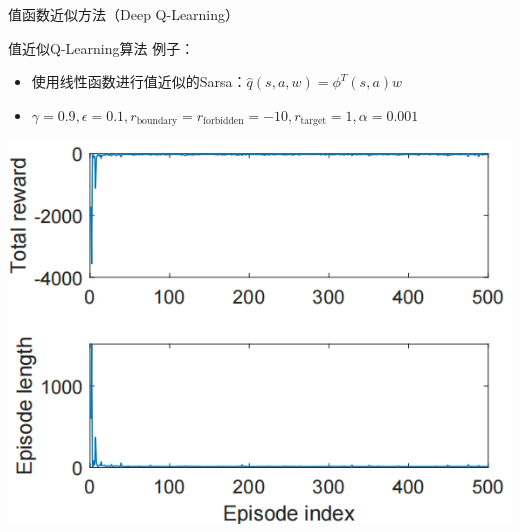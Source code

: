 \begin{section}{值函数近似方法\alert{（Deep Q-Learning）}}
\begin{frame}{值近似Q-Learning算法}
    例子：
    \begin{itemize}
        \item 使用\alert{线性函数}进行值近似的Sarsa：$\hat{q}(s,a,w)=\phi^T(s,a)w$
        \item $\gamma=0.9,\epsilon=0.1,r_\text{boundary}=r_\text{forbidden}=-10, r_\text{target}=1,\alpha=0.001$
    \end{itemize}
    \begin{center}
        \begin{minipage}{0.3\textwidth}
            \centering
            \includegraphics[width=\linewidth]{assets/valueqlearningepisode.png}
        \end{minipage}
        \hspace{1cm}
        \begin{minipage}{0.3\textwidth}
            \centering

\end{minipage}
\end{center}
\end{frame}
\end{section}
